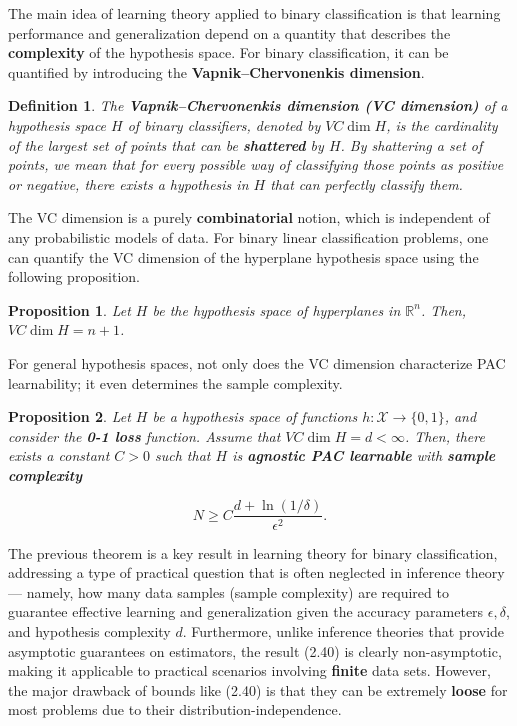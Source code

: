 \documentclass{report}
\newtheorem{definition}{Definition}[chapter]
\newtheorem{proposition}{Proposition}[chapter]
\begin{document}
The main idea of learning theory applied to binary classification is that learning performance and generalization depend on a quantity that describes the \textbf{complexity} of the hypothesis space.
For binary classification, it can be quantified by introducing the \textbf{Vapnik–Chervonenkis dimension}.

\begin{definition}
The \textbf{Vapnik–Chervonenkis dimension (VC dimension)} of a hypothesis space $H$ of binary classifiers, denoted by $VC\dim H$, is the cardinality of the largest set of points that can be \textbf{shattered} by $H$. By shattering a set of points, we mean that for every possible way of classifying those points as positive or negative, there exists a hypothesis in $H$ that can perfectly classify them.
\end{definition}

The VC dimension is a purely \textbf{combinatorial} notion, which is independent of any probabilistic models of data. For binary linear classification problems, one can quantify the VC dimension of the hyperplane hypothesis space using the following proposition.

\begin{proposition}
Let $H$ be the hypothesis space of hyperplanes in $\mathbb{R}^n$. Then, $VC\dim H = n + 1$.
\end{proposition}

For general hypothesis spaces, not only does the VC dimension characterize PAC learnability; it even determines the sample complexity.

\begin{proposition}
Let $H$ be a hypothesis space of functions $h : \mathcal{X} \to \{0, 1\}$, and consider the \textbf{0-1 loss} function. Assume that $VC\dim H = d < \infty$. Then, there exists a constant $C> 0$ such that $H$ is \textbf{agnostic PAC learnable} with \textbf{sample complexity}

\begin{equation}
N \geq C\frac{d + \ln (1/\delta)}{\epsilon^2}.
\end{equation}
\end{proposition}

The previous theorem is a key result in learning theory for binary classification, addressing a type of practical question that is often neglected in inference theory — namely, how many data samples (sample complexity) are required to guarantee effective learning and generalization given the accuracy parameters $\epsilon, \delta$, and hypothesis complexity $d$. Furthermore, unlike inference theories that provide asymptotic guarantees on estimators, the result (2.40) is clearly non-asymptotic, making it applicable to practical scenarios involving \textbf{finite} data sets. However, the major drawback of bounds like (2.40) is that they can be extremely \textbf{loose} for most problems due to their distribution-independence.
\end{document}
